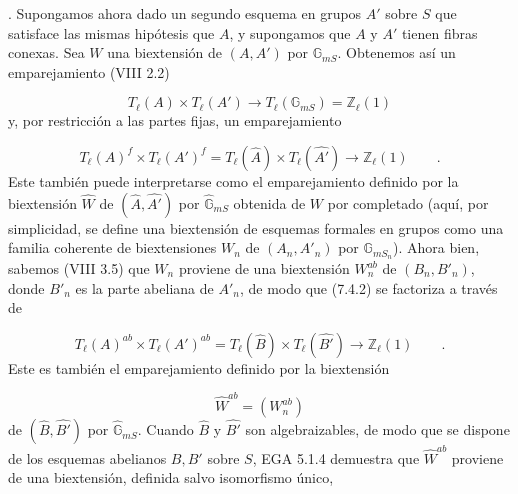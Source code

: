 
\medskip
{}. Supongamos ahora dado un segundo esquema en grupos $A'$ sobre $S$
que satisface las mismas hipótesis que $A$, y supongamos que $A$ y $A'$
tienen fibras conexas. Sea $W$ una biextensión de $(A,A')$ por
$\mathbb G_{mS}$. Obtenemos así un emparejamiento (VIII 2.2)

\begin{equation}\tag{7.4.1}
T_{\ell}(A) \times T_{\ell}(A') \longrightarrow
T_{\ell}(\mathbb G_{mS}) = \mathbb Z_{\ell}(1)
\end{equation}
y, por restricción a las partes fijas, un emparejamiento

\begin{equation}\tag{7.4.2}
T_{\ell}(A)^{f} \times T_{\ell}(A')^{f}
 = T_{\ell}(\widehat A) \times T_{\ell}(\widehat {A'})
 \longrightarrow \mathbb Z_{\ell}(1) \qquad .
\end{equation}
Este también puede interpretarse como el emparejamiento definido por
la biextensión $\widehat W$ de $(\widehat A,\widehat {A'})$ por
$\widehat{\mathbb G}_{mS}$ obtenida de $W$ por completado (aquí, por
simplicidad, se define una biextensión de esquemas formales en grupos
como una familia coherente de biextensiones $W_n$ de $(A_n,A'_n)$ por
$\mathbb G_{mS_n}$). Ahora bien, sabemos (VIII 3.5) que $W_n$ proviene
de una biextensión $W_n^{ab}$ de $(B_n,B'_n)$, donde $B'_n$ es la parte
abeliana de $A'_n$, de modo que (7.4.2) se factoriza a través de

\begin{equation}\tag{7.4.3}
T_{\ell}(A)^{ab} \times T_{\ell}(A')^{ab}
 = T_{\ell}(\widehat B) \times T_{\ell}(\widehat {B'})
 \longrightarrow \mathbb Z_{\ell}(1) \qquad .
\end{equation}
Este es también el emparejamiento definido por la biextensión

\begin{equation*}
\widehat W^{ab}=(W_n^{ab})
\end{equation*}
de $(\widehat B,\widehat {B'})$ por $\widehat{\mathbb G}_{mS}$. Cuando
$\widehat B$ y $\widehat {B'}$ son algebraizables, de modo que se
dispone de los esquemas abelianos $B,B'$ sobre $S$, EGA  5.1.4
demuestra que $\widehat W^{ab}$ proviene de una biextensión, definida
salvo isomorfismo único,


